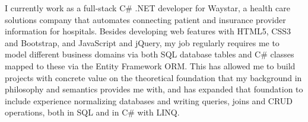 I currently work as a full-stack C\# .NET developer for Waystar, 
a health care solutions company that automates connecting patient and insurance provider information for hospitals. 
Besides developing web features with HTML5, CSS3 and Bootstrap, and JavaScript and jQuery, 
my job regularly requires me to model different business domains 
via both SQL database tables and C\# classes mapped to these via the Entity Framework ORM. 
This has allowed me to build projects with concrete value on the theoretical foundation that my background in philosophy and semantics provides me with, 
and has expanded that foundation to include experience normalizing databases and writing queries, joins and CRUD operations, 
both in SQL and in C\# with LINQ. 